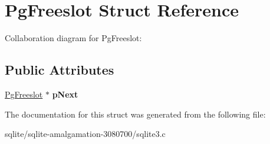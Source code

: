 \hypertarget{struct_pg_freeslot}{\section{Pg\+Freeslot Struct Reference}
\label{struct_pg_freeslot}
}


Collaboration diagram for Pg\+Freeslot\+:
\subsection*{Public Attributes}
\begin{DoxyCompactItemize}
\item 
\hypertarget{struct_pg_freeslot_ac38a6e51f86c650fb943585d7b6c8b70}{\hyperlink{struct_pg_freeslot}{Pg\+Freeslot} $\ast$ {\bfseries p\+Next}}\label{struct_pg_freeslot_ac38a6e51f86c650fb943585d7b6c8b70}

\end{DoxyCompactItemize}


The documentation for this struct was generated from the following file\+:\begin{DoxyCompactItemize}
\item 
sqlite/sqlite-\/amalgamation-\/3080700/sqlite3.\+c\end{DoxyCompactItemize}
